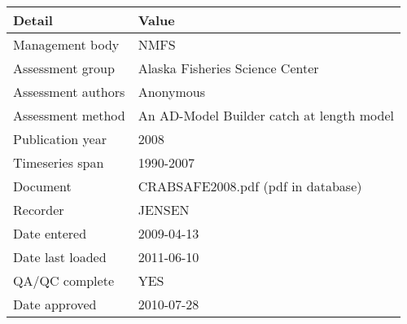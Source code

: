 \begin{table}[htb]
\centering
\begin{tabular}{lp{7cm}}
\toprule
Detail & Value \\
\midrule
Management body    & NMFS                                      \\
Assessment group   & Alaska Fisheries Science Center           \\
Assessment authors & Anonymous                                 \\
Assessment method  & An AD-Model Builder catch at length model \\
Publication year   & 2008                                      \\
Timeseries span    & 1990-2007                                 \\
Document           & CRABSAFE2008.pdf (pdf in database)        \\
Recorder           & JENSEN                                    \\
Date entered       & 2009-04-13                                \\
Date last loaded   & 2011-06-10                                \\
QA/QC complete     & YES                                       \\
Date approved      & 2010-07-28                                \\
\bottomrule
\end{tabular}
\label{tab:assessdet}
\end{table}
